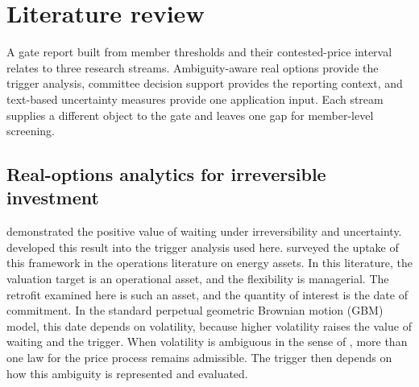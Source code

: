 

\section{Literature review}

A gate report built from member thresholds and their contested-price interval relates to three research streams. Ambiguity-aware real options provide the trigger analysis, committee decision support provides the reporting context, and text-based uncertainty measures provide one application input. Each stream supplies a different object to the gate and leaves one gap for member-level screening.

\subsection{Real-options analytics for irreversible investment}

\citet{McDonaldSiegel1986} demonstrated the positive value of waiting under irreversibility and uncertainty. \citet{DixitPindyck1994} developed this result into the trigger analysis used here. \citet{NadarajahSecomandi2023} surveyed the uptake of this framework in the operations literature on energy assets. In this literature, the valuation target is an operational asset, and the flexibility is managerial. The retrofit examined here is such an asset, and the quantity of interest is the date of commitment. In the standard perpetual geometric Brownian motion (GBM) model, this date depends on volatility, because higher volatility raises the value of waiting and the trigger. When volatility is ambiguous in the sense of \citet{Ellsberg1961}, more than one law for the price process remains admissible. The trigger then depends on how this ambiguity is represented and evaluated.


